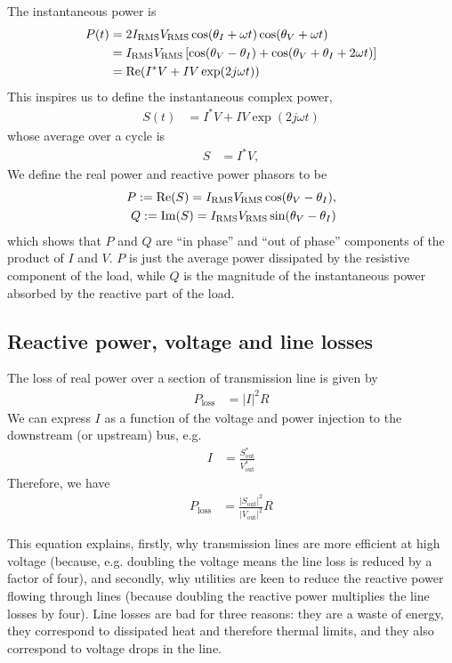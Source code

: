 \documentclass[10pt]{article}
\newcommand{\re}[1]{\ensuremath{\operatorname{Re}(#1)}}
\newcommand{\im}[1]{\ensuremath{\operatorname{Im}(#1)}}
\begin{document}
The instantaneous power is
\begin{align}
	P(t) &= 2I_\text{RMS}V_\text{RMS}\cos(\theta_I + \omega t)\cos(\theta_V + \omega t) \notag \\
	     &= I_\text{RMS}V_\text{RMS}\left[\cos(\theta_V - \theta_I) + \cos(\theta_V + \theta_I + 2 \omega t)\right] \notag \\
		 &= \re{I^*V + IV\exp(2j \omega t)}
\end{align}
This inspires us to define the instantaneous complex power,
\begin{align}
	S(t) &= I^*V + IV\exp(2j \omega t)
\end{align}
whose average over a cycle is
\begin{align}
	S &= I^*V,
\end{align}
We define the real power and reactive power phasors to be 
\begin{align}
	P := \re{S} = I_\text{RMS}V_\text{RMS}\cos(\theta_V - \theta_I), \notag \\
	Q := \im{S} = I_\text{RMS}V_\text{RMS}\sin(\theta_V - \theta_I)
\end{align}
which shows that $P$ and $Q$ are ``in phase'' and ``out of phase'' components of the product of $I$ and $V$. $P$ is just the average power dissipated by the resistive component of the load, while $Q$ is the magnitude of the instantaneous power absorbed by the reactive part of the load.

\subsection{Reactive power, voltage and line losses}
The loss of real power over a section of transmission line is given by
\begin{align}
	P_\text{loss} &= \left|I\right|^2 R
\end{align}
We can express $I$ as a function of the voltage and power injection to the downstream (or upstream) bus, e.g.
\begin{align}
	I &= \frac{S^*_\text{out}}{V^*_\text{out}}
\end{align}
Therefore, we have
\begin{align}
	P_\text{loss} &= \frac{\left|S_\text{out}\right|^2}{\left|V_\text{out}\right|^2}R
\end{align}

This equation explains, firstly, why transmission lines are more efficient at high voltage (because, e.g. doubling the voltage means the line loss is reduced by a factor of four), and secondly, why utilities are keen to reduce the reactive power flowing through lines (because doubling the reactive power multiplies the line losses by four). Line losses are bad for three reasons: they are a waste of energy, they correspond to dissipated heat and therefore thermal limits, and they also correspond to voltage drops in the line.
\end{document}
